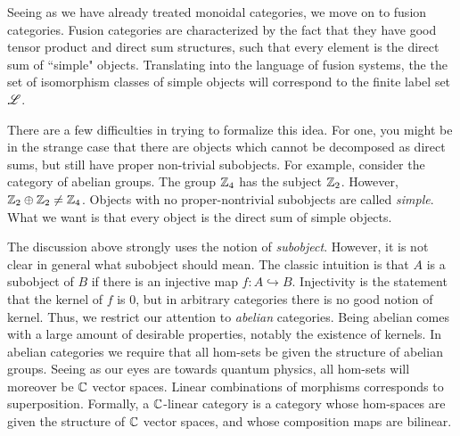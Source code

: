 \documentclass{article}
\theoremstyle{definition}
\numberwithin{figure}{section}
\begin{document}
Seeing as we have already treated monoidal categories, we move on to fusion categories. Fusion categories are characterized by the fact that they have good tensor product and direct sum structures, such that every element is the direct sum of ``simple" objects. Translating into the language of fusion systems, the the set of isomorphism classes of simple objects will correspond to the finite label set $\mathscr{L}$.

There are a few difficulties in trying to formalize this idea. For one, you might be in the strange case that there are objects which cannot be decomposed as direct sums, but still have proper non-trivial subobjects. For example, consider the category of abelian groups. The group $\mathbb{Z}_4$ has the subject $\mathbb{Z}_2$. However, $\mathbb{Z}_2\oplus\mathbb{Z}_2\neq \mathbb{Z}_4$. Objects with no proper-nontrivial subobjects are called \textit{simple}. What we want is that every object is the direct sum of simple objects.

The discussion above strongly uses the notion of \textit{subobject}. However, it is not clear in general what subobject should mean. The classic intuition is that $A$ is a subobject of $B$ if there is an injective map $f:A\hookrightarrow{}B$. Injectivity is the statement that the kernel of $f$ is $0$, but in arbitrary categories there is no good notion of kernel. Thus, we restrict our attention to \textit{abelian} categories. Being abelian comes with a large amount of desirable properties, notably the existence of kernels. In abelian categories we require that all hom-sets be given the structure of abelian groups. Seeing as our eyes are towards quantum physics, all hom-sets will moreover be $\mathbb{C}$ vector spaces. Linear combinations of morphisms corresponds to superposition. Formally, a $\mathbb{C}$-linear category is a category whose hom-spaces are given the structure of $\mathbb{C}$ vector spaces, and whose composition maps are bilinear.
\end{document}
